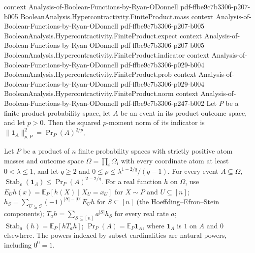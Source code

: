 \begin{theorem}
  {context}
  {Analysis-of-Boolean-Functions-by-Ryan-ODonnell}
  {pdf-ffbe9c7b3306-p207-b005}
\proofstep
  {BooleanAnalysis.Hypercontractivity.FiniteProduct.mass}
  {context}
  {Analysis-of-Boolean-Functions-by-Ryan-ODonnell}
  {pdf-ffbe9c7b3306-p207-b005}
\proofstep
  {BooleanAnalysis.Hypercontractivity.FiniteProduct.expect}
  {context}
  {Analysis-of-Boolean-Functions-by-Ryan-ODonnell}
  {pdf-ffbe9c7b3306-p207-b005}
\proofstep
  {BooleanAnalysis.Hypercontractivity.FiniteProduct.indicator}
  {context}
  {Analysis-of-Boolean-Functions-by-Ryan-ODonnell}
  {pdf-ffbe9c7b3306-p029-b004}
\proofstep
  {BooleanAnalysis.Hypercontractivity.FiniteProduct.prob}
  {context}
  {Analysis-of-Boolean-Functions-by-Ryan-ODonnell}
  {pdf-ffbe9c7b3306-p029-b004}
\proofstep
  {BooleanAnalysis.Hypercontractivity.FiniteProduct.norm}
  {context}
  {Analysis-of-Boolean-Functions-by-Ryan-ODonnell}
  {pdf-ffbe9c7b3306-p247-b002}
Let $P$ be a finite product probability space, let $A$ be an event in its product
outcome space, and let $p>0$. Then the squared $p$-moment norm of its indicator is
$\|\mathbf 1_A\|_{p,P}^{2}=\Pr_P(A)^{2/p}$.
\end{theorem}

\begin{theorem}
\leanok
{}
Let $P$ be a product of $n$ finite probability spaces with strictly positive atom masses and outcome space $\Omega=\prod_i\Omega_i$ with every coordinate atom at least $0<\lambda\le1$, and let $q\ge2$ and $0\le\rho\le\lambda^{1-2/q}/(q-1)$. For every event $A\subseteq\Omega$, $\operatorname{Stab}_\rho(\mathbf1_A)\le\Pr_P(A)^{2-2/q}$. For a real function $h$ on $\Omega$, use $E_Uh(x)=\mathbb E_P[h(X)\mid X_U=x_U]$ for $X\sim P$ and $U\subseteq[n]$; $h_S=\sum_{U\subseteq S}(-1)^{|S|-|U|}E_Uh$ for $S\subseteq[n]$ (the Hoeffding--Efron--Stein components); $T_a h=\sum_{S\subseteq[n]}a^{|S|}h_S$ for every real rate $a$; $\operatorname{Stab}_a(h)=\mathbb E_P[hT_a h]$; $\Pr_P(A)=\mathbb E_P\mathbf1_A$, where $\mathbf1_A$ is $1$ on $A$ and $0$ elsewhere. The powers indexed by subset cardinalities are natural powers, including $0^0=1$.
\end{theorem}


